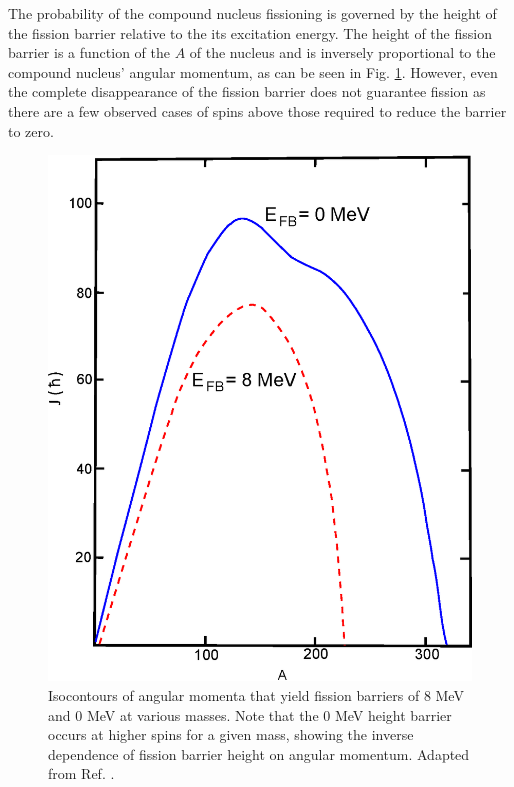 The probability of the compound nucleus fissioning is governed by the height of the fission barrier relative to the its excitation energy. The height of the fission barrier is a function of the $A$ of the nucleus and is inversely proportional to the compound nucleus' angular momentum, as can be seen in Fig. \ref{fig:chp3-fission-barrier}. However, even the complete disappearance of the fission barrier does not guarantee fission as there are a few observed cases of spins above those required to reduce the barrier to zero\cite{hyperdef,hyperdef2}.

\begin{figure}[h!]
	\centerline{\includegraphics[height=0.3\textheight]{./img/c3/fission_barrier.eps}}
	\caption{Isocontours of angular momenta that yield fission barriers of $8$ MeV and $0$ MeV at various masses. Note that the $0$ MeV height barrier occurs at higher spins for a given mass, showing the inverse dependence of fission barrier height on angular momentum. Adapted from Ref. \cite{fissionBarrier2}.}
	\label{fig:chp3-fission-barrier}
\end{figure}

